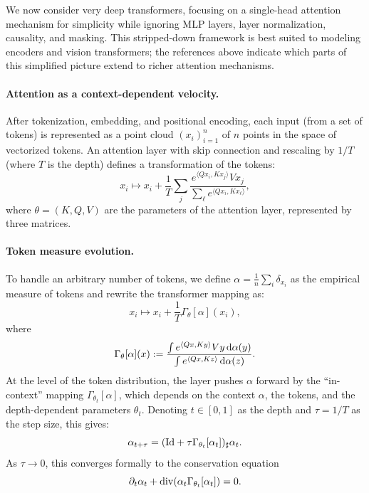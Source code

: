 We now consider very deep transformers, focusing on a single-head attention mechanism for simplicity while ignoring MLP layers, layer normalization, causality, and masking. This stripped-down framework is best suited to modeling encoders and vision transformers; the references above indicate which parts of this simplified picture extend to richer attention mechanisms.

\paragraph{Attention as a context-dependent velocity.}

After tokenization, embedding, and positional encoding, each input (from a set of tokens) is represented as a point cloud $(x_i)_{i=1}^n$ of $n$ points in the space of vectorized tokens. An attention layer with skip connection and rescaling by $1/T$ (where $T$ is the depth) defines a transformation of the tokens:
\begin{equation*}
    x_i \mapsto x_i + \frac{1}{T} \sum_j \frac{e^{\langle Q x_i, K x_j \rangle} V x_j}{\sum_{\ell} e^{\langle Q x_i, K x_\ell \rangle}},
\end{equation*}
where $\theta = (K, Q, V)$ are the parameters of the attention layer, represented by three matrices.

\paragraph{Token measure evolution.}

To handle an arbitrary number of tokens, we define $\alpha = \frac{1}{n} \sum_i \delta_{x_i}$ as the empirical measure of tokens and rewrite the transformer mapping as:
\begin{equation*}
    x_i \mapsto x_i + \frac{1}{T} \Gamma_\theta[\alpha](x_i),
\end{equation*}
where
\begin{equation*}
    \Gamma_\theta[\alpha](x) :=
    \frac{\int e^{\langle Q x, K y \rangle} V y \, \mathrm{d} \alpha(y)}
    {\int e^{\langle Q x, K z \rangle} \, \mathrm{d} \alpha(z)}.
\end{equation*}
At the level of the token distribution, the layer pushes $\alpha$ forward by the ``in-context'' mapping $\Gamma_{\theta_t}[\alpha]$, which depends on the context $\alpha$, the tokens, and the depth-dependent parameters $\theta_t$. Denoting $t \in [0, 1]$ as the depth and $\tau = 1/T$ as the step size, this gives:
\begin{equation*}
    \alpha_{t+\tau} = (\mathrm{Id} + \tau \Gamma_{\theta_t}[\alpha_t])_\sharp \alpha_t.
\end{equation*}
As $\tau \to 0$, this converges formally to the conservation equation
\begin{equation*}
    \partial_t \alpha_t + \operatorname{div}(\alpha_t \Gamma_{\theta_t}[\alpha_t]) = 0.
\end{equation*}

